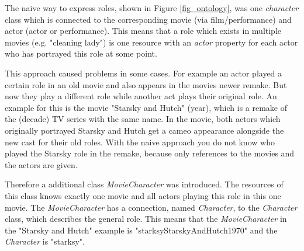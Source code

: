 The naive way to express roles, shown in Figure \ref{fig_ontology}, was one \emph{character} class which is connected to the corresponding movie (via film/performance) and actor (actor or performance).
This means that a role which exists in multiple movies (e.g. "cleaning lady") is one resource with an \emph{actor} property for each actor who has portrayed this role at some point. 

This approach caused problems in some cases.
For example an actor played a certain role in an old movie and also appears in the movies newer remake.
But now they play a different role while another act plays their original role. 
An example for this is the movie "Starsky and Hutch" (year), which is a remake of the (decade) TV series with the same name.
In the movie, both actors which originally portrayed Starsky and Hutch get a cameo appearance alongside the new cast for their old roles.
With the naive approach you do not know who played the Starsky role in the remake, because only references to the movies and the actors are given.

Therefore a additional class \emph{MovieCharacter} was introduced.
The resources of this class knows exactly one movie and all actors playing this role in this one movie.
The \emph{MovieCharacter} has a connection, named \emph{Character}, to the \emph{Character} class, which describes the general role.
This means that the \emph{MovieCharacter} in the "Starsky and Hutch" example is "starksyStarskyAndHutch1970" and the \emph{Character} is "starksy".

